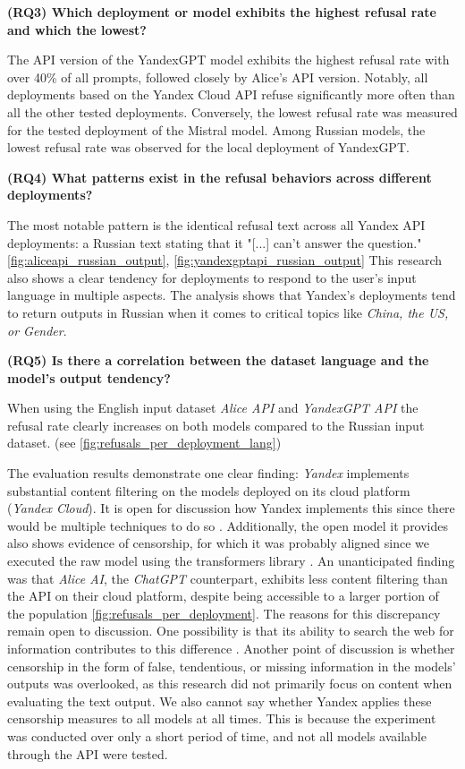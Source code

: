 \textbf{(RQ3) Which deployment or model exhibits the highest refusal rate and which the lowest?}

The API version of the YandexGPT model exhibits the highest refusal rate with over 40\% of all prompts, followed closely by Alice's API version. Notably, all deployments based on the Yandex Cloud API refuse significantly more often than all the other tested deployments. Conversely, the lowest refusal rate was measured for the tested deployment of the Mistral model. Among Russian models, the lowest refusal rate was observed for the local deployment of YandexGPT.

\textbf{(RQ4) What patterns exist in the refusal behaviors across different deployments?}

The most notable pattern is the identical refusal text across all Yandex API deployments: a Russian text stating that it "[...] can't answer the question." \ref{fig:aliceapi_russian_output}, \ref{fig:yandexgptapi_russian_output}
This research also shows a clear tendency for deployments to respond to the user's input language in multiple aspects. The analysis shows that Yandex's deployments tend to return outputs in Russian when it comes to critical topics like \textit{China, the US, or Gender}.

\textbf{(RQ5) Is there a correlation between the dataset language and the model's output tendency?}

When using the English input dataset \textit{Alice API} and \textit{YandexGPT API} the refusal rate clearly increases on both models compared to the Russian input dataset. (see \ref{fig:refusals_per_deployment_lang})


The evaluation results demonstrate one clear finding: \textit{Yandex} implements substantial content filtering on the models deployed on its cloud platform (\textit{Yandex Cloud}). It is open for discussion how Yandex implements this since there would be multiple techniques to do so \autocite{garcia-ferreroRefusalSteeringFinegrained2025}. Additionally, the open model it provides also shows evidence of censorship, for which it was probably aligned since we executed the raw model using the transformers library \autocite{wangRefusalDirectionUniversal2026}. An unanticipated finding was that \textit{Alice AI}, the \textit{ChatGPT} counterpart, exhibits less content filtering than the API on their cloud platform, despite being accessible to a larger portion of the population \ref{fig:refusals_per_deployment}. The reasons for this discrepancy remain open to discussion. One possibility is that its ability to search the web for information contributes to this difference \autocite{lewisRetrievalaugmentedGenerationKnowledgeintensive2020}. Another point of discussion is whether censorship in the form of false, tendentious, or missing information in the models' outputs was overlooked, as this research did not primarily focus on content when evaluating the text output. We also cannot say whether Yandex applies these censorship measures to all models at all times. This is because the experiment was conducted over only a short period of time, and not all models available through the API were tested.

